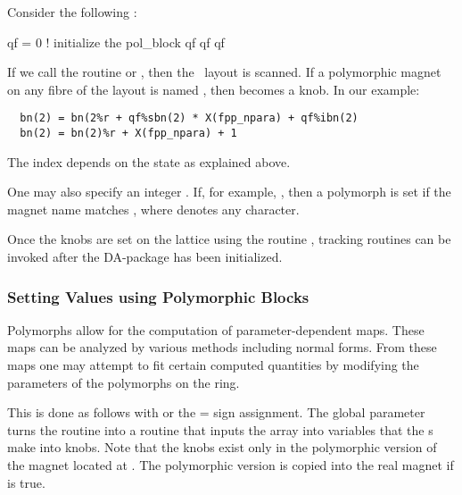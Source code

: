 Consider the following :
\begin{ptccode}
qf = 0         ! initialize the pol_block qf
qf%
qf%
\end{ptccode}
%
%
If we call the routine  or , then the \DNA\ layout  is scanned. If a polymorphic magnet on any fibre of the layout  is named , then  becomes a knob. In our example:
\begin{verbatim}
  bn(2) = bn(2%r + qf%sbn(2) * X(fpp_npara) + qf%ibn(2)
  bn(2) = bn(2)%r + X(fpp_npara) + 1
\end{verbatim}
The index  depends on the state as explained above.

One may also specify an integer . If, for example, , then a polymorph is set if the magnet name matches , where  denotes any character.

Once the knobs are set on the lattice using the routine , tracking routines can be invoked after the DA-package has been initialized.


\subsubsection{Setting Values using Polymorphic Blocks}

%
Polymorphs allow for the computation of parameter-dependent maps. These maps can be analyzed by various methods including normal forms. From these maps one may attempt to fit certain computed quantities by modifying the parameters of the polymorphs on the ring.

%
This is done as follows with  or the
= sign assignment. The global parameter  turns
the  routine into a routine that inputs
the array  into variables that the
s make into knobs. Note that the knobs exist only
in the polymorphic version of the magnet located at .
The polymorphic version is copied into the real magnet  if  is true.

